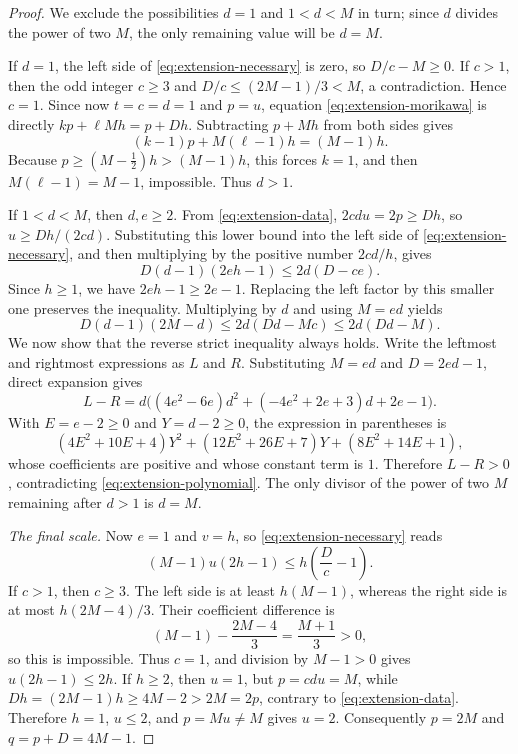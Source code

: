 \documentclass[11pt]{article}
\theoremstyle{definition}
\theoremstyle{remark}
\begin{document}
\begin{proof}
We exclude the possibilities \(d=1\) and \(1<d<M\) in turn; since \(d\)
divides the power of two \(M\), the only remaining value will be \(d=M\).

If \(d=1\), the left side of \eqref{eq:extension-necessary} is zero, so
\(D/c-M\ge0\).  If \(c>1\), then the odd integer \(c\ge3\) and
\(D/c\le(2M-1)/3<M\), a contradiction.  Hence \(c=1\).  Since now
\(t=c=d=1\) and \(p=u\), equation \eqref{eq:extension-morikawa} is
directly
\(kp+\ell Mh=p+Dh\).  Subtracting
\(p+Mh\) from both sides gives
\[
 (k-1)p+M(\ell-1)h=(M-1)h.
\]
Because \(p\ge(M-\tfrac12)h>(M-1)h\), this forces \(k=1\), and then
\(M(\ell-1)=M-1\), impossible.  Thus \(d>1\).

If \(1<d<M\), then \(d,e\ge2\).  From
\eqref{eq:extension-data},
\(2cdu=2p\ge Dh\), so \(u\ge Dh/(2cd)\).  Substituting this lower
bound into the left side of \eqref{eq:extension-necessary}, and then
multiplying by the positive number \(2cd/h\), gives
\[
 D(d-1)(2eh-1)\le2d(D-ce).
\]
Since \(h\ge1\), we have \(2eh-1\ge2e-1\).  Replacing the left factor
by this smaller one preserves the inequality.  Multiplying by \(d\) and
using \(M=ed\) yields
\begin{equation}\label{eq:extension-polynomial}
 D(d-1)(2M-d)\le2d(Dd-Mc)\le2d(Dd-M).
\end{equation}
We now show that the reverse strict inequality always holds.  Write the
leftmost and rightmost expressions as \(L\) and \(R\).  Substituting
\(M=ed\) and \(D=2ed-1\), direct expansion gives
\[
 L-R=d\bigl((4e^2-6e)d^2+(-4e^2+2e+3)d+2e-1\bigr).
\]
With \(E=e-2\ge0\) and \(Y=d-2\ge0\), the expression in parentheses is
\[
 (4E^2+10E+4)Y^2+(12E^2+26E+7)Y+(8E^2+14E+1),
\]
whose coefficients are positive and whose constant term is \(1\).
Therefore \(L-R>0\), contradicting \eqref{eq:extension-polynomial}.  The
only divisor of the power of two \(M\) remaining after \(d>1\) is
\(d=M\).

\smallskip
\noindent\emph{The final scale.}
Now \(e=1\) and \(v=h\), so \eqref{eq:extension-necessary} reads
\[
 (M-1)u(2h-1)\le h\left(\frac Dc-1\right).
\]
If \(c>1\), then \(c\ge3\).  The left side is at least \(h(M-1)\),
whereas the right side is at most \(h(2M-4)/3\).  Their coefficient
difference is
\[
 (M-1)-\frac{2M-4}{3}=\frac{M+1}{3}>0,
\]
so this is impossible.  Thus \(c=1\), and division by \(M-1>0\) gives
\(u(2h-1)\le2h\).  If \(h\ge2\), then \(u=1\), but
\(p=cdu=M\), while
\(Dh=(2M-1)h\ge4M-2>2M=2p\), contrary to
\eqref{eq:extension-data}.  Therefore
\(h=1\), \(u\le2\), and \(p=Mu\ne M\) gives \(u=2\).  Consequently
\(p=2M\) and \(q=p+D=4M-1\).
\end{proof}
\end{document}
